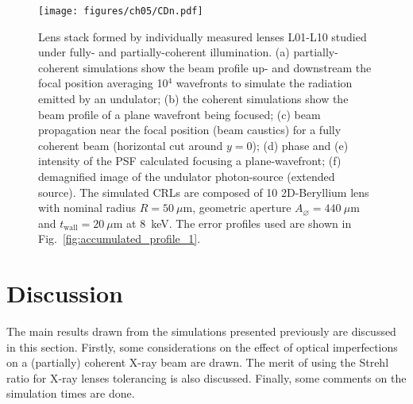 \begin{refsection}
\begin{figure}[t]
        \centering
        {\texttt{[image: figures/ch05/CDn.pdf]}}
        \caption[L01-L10 studied under fully- and partially-coherent illuminations]{Lens stack formed by individually measured lenses L01-L10 studied under fully- and partially-coherent illumination. (a) partially-coherent simulations show the beam profile up- and downstream the focal position averaging 10$^{4}$ wavefronts to simulate the radiation emitted by an undulator; (b) the coherent simulations show the beam profile of a plane wavefront being focused; (c) beam propagation near the focal position (beam caustics) for a fully coherent beam (horizontal cut around $y=0$); (d) phase and (e) intensity of the PSF calculated focusing a plane-wavefront; (f) demagnified image of the undulator photon-source (extended source). The simulated CRLs are composed of 10 2D-Beryllium lens with nominal radius $R=50~\mu\text{m}$, geometric aperture $A_{\diameter}=440~\mu\text{m}$ and $t_\text{wall}=20~\mu$m at 8~keV. The error profiles used are shown in Fig.~\ref{fig:accumulated_profile_1}.}\label{fig:CDnS}
\end{figure}

\clearpage


\section{Discussion}\label{sec:discussion}

The main results drawn from the simulations presented previously are discussed in this section. Firstly, some considerations on the effect of optical imperfections on a (partially) coherent X-ray beam are drawn. The merit of using the Strehl ratio for X-ray lenses tolerancing is also discussed. Finally, some comments on the simulation times are done.


\end{refsection}
